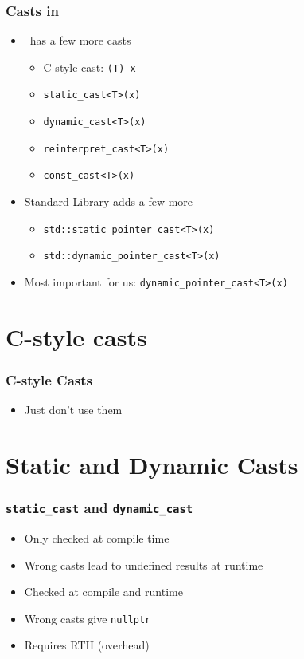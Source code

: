 \begin{frame}
  \frametitle{Casts in \cpp}
  \begin{itemize}
    \item \cpp~has a few more casts
          \begin{itemize}
            \item C-style cast: {\tt (T) x}
            \item {\tt static\_cast<T>(x)}
            \item {\tt dynamic\_cast<T>(x)}
            \item {\tt reinterpret\_cast<T>(x)}
            \item {\tt const\_cast<T>(x)}
          \end{itemize}
          \vskip5mm
    \item Standard Library adds a few more
          \begin{itemize}
            \item {\tt std::static\_pointer\_cast<T>(x)}
            \item {\tt std::dynamic\_pointer\_cast<T>(x)}
          \end{itemize}
          \vskip5mm
    \item Most important for us: {\tt dynamic\_pointer\_cast<T>(x)}
  \end{itemize}
\end{frame}

\section{C-style casts}

\frame{\tableofcontents[currentsection]}

\begin{frame}
  \frametitle{C-style Casts}
  \begin{itemize}
    \item Just don't use them
  \end{itemize}
\end{frame}

\section{Static and Dynamic Casts}

\frame{\tableofcontents[currentsection]}


\begin{frame}
  \frametitle{{\tt static\_cast} and {\tt dynamic\_cast}}
  \begin{itemize}
    \item Only checked at compile time
    \item Wrong casts lead to undefined results at runtime
  \end{itemize}
  \vskip5mm
  \begin{itemize}
    \item Checked at compile and runtime
    \item Wrong casts give {\tt nullptr}
    \item Requires RTII (overhead)
  \end{itemize}
\end{frame}

